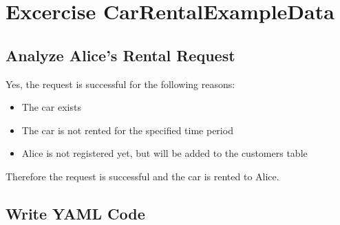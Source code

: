 \section{Excercise CarRentalExampleData}

\subsection*{Analyze Alice's Rental Request}
Yes, the request is successful for the following reasons:
\begin{itemize}
    \item The car exists
    \item The car is not rented for the specified time period
    \item Alice is not registered yet, but will be added to the customers table
\end{itemize}
Therefore the request is successful and the car is rented to Alice.

\subsection*{Write YAML Code}

